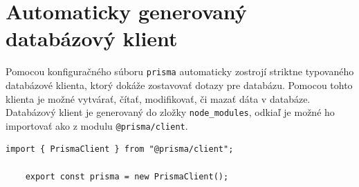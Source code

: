 \section{Automaticky generovaný databázový klient}
Pomocou konfiguračného súboru \texttt{prisma} automaticky zostrojí striktne typovaného databázové klienta, ktorý dokáže zostavovať dotazy pre databázu. Pomocou tohto klienta je možné vytvárať, čítať, modifikovať, či mazať dáta v databáze. \\

\noindent Databázový klient je generovaný do zložky \texttt{node\_modules}, odkiaľ je možné ho importovať ako z modulu \texttt{@prisma/client}. \\

\begin{lstlisting}[caption=Príklad vytvorenia instancie databázového klienta v Slackify.]
	import { PrismaClient } from "@prisma/client";

	export const prisma = new PrismaClient();
\end{lstlisting}